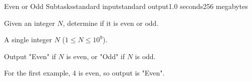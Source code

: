 \begin{problem}{Even or Odd Subtasks}{standard input}{standard output}{1.0 seconds}{256 megabytes}

Given an integer $N$, determine if it is even or odd.

A single integer $N$ ($1 \le N \le 10^9$).

\outputfile
Output "Even" if $N$ is even, or "Odd" if $N$ is odd.

\Examples

\begin{example}
%
\end{example}

\note
For the first example, 4 is even, so output is "Even".

\end{problem}